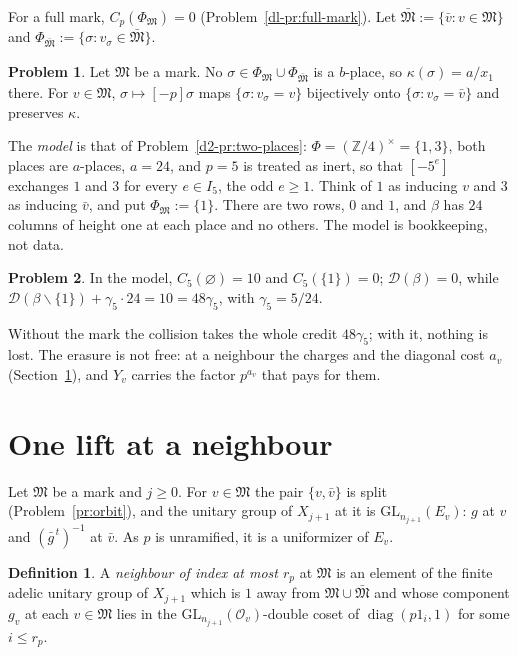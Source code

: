 \documentclass[reqno]{amsart}
\theoremstyle{plain}
\theoremstyle{definition}
\newtheorem{problem}{Problem}[section]
\newtheorem{definition}[theorem]{Definition}
\theoremstyle{remark}
\newcommand{\Z}{\mathbb{Z}}
\newcommand{\Oc}{\mathcal O}
\newcommand{\Dc}{\mathcal D}
\newcommand{\Mk}{\mathfrak M}
\newcommand{\Mb}{\bar{\mathfrak M}}
\begin{document}
For a full mark, \(C_p(\Phi_{\Mk}) = 0\) (Problem~\ref{dl-pr:full-mark}).  Let \(\Mb := \{\bar v : v \in \Mk\}\) and \(\Phi_{\Mb} := \{\sigma : v_\sigma \in \Mb\}\).

\begin{problem}\label{pr:no-b-place}
Let \(\Mk\) be a mark.  No \(\sigma \in \Phi_{\Mk} \cup \Phi_{\Mb}\) is a \(b\)-place, so \(\kappa(\sigma) = a/x_1\) there.  For \(v \in \Mk\), \(\sigma \mapsto [-p]\sigma\) maps \(\{\sigma : v_\sigma = v\}\) bijectively onto \(\{\sigma : v_\sigma = \bar v\}\) and preserves \(\kappa\).
\end{problem}

The \emph{model} is that of Problem~\ref{d2-pr:two-places}: \(\Phi = (\Z/4)^\times = \{1, 3\}\), both places are \(a\)-places, \(a = 24\), and \(p = 5\) is treated as inert, so that \([-5^e]\) exchanges \(1\) and \(3\) for every \(e \in I_5\), the odd \(e \ge 1\).  Think of \(1\) as inducing \(v\) and \(3\) as inducing \(\bar v\), and put \(\Phi_{\Mk} := \{1\}\).  There are two rows, \(0\) and \(1\), and \(\beta\) has \(24\) columns of height one at each place and no others.  The model is bookkeeping, not data.

\begin{problem}\label{pr:model-mark}
In the model, \(C_5(\varnothing) = 10\) and \(C_5(\{1\}) = 0\); \(\Dc(\beta) = 0\), while \(\Dc(\beta \smallsetminus \{1\}) + \gamma_5 \cdot 24 = 10 = 48\gamma_5\), with \(\gamma_5 = 5/24\).
\end{problem}

Without the mark the collision takes the whole credit \(48\gamma_5\); with it, nothing is lost.  The erasure is not free: at a neighbour the charges and the diagonal cost \(a_v\) (Section~\ref{sec:neighbour}), and \(Y_v\) carries the factor \(p^{a_v}\) that pays for them.

\section{One lift at a neighbour}\label{sec:neighbour}

Let \(\Mk\) be a mark and \(j \ge 0\).  For \(v \in \Mk\) the pair \(\{v, \bar v\}\) is split (Problem~\ref{pr:orbit}), and the unitary group of \(X_{j+1}\) at it is \(\mathrm{GL}_{n_{j+1}}(E_v)\): \(g\) at \(v\) and \((\bar g^{\,t})^{-1}\) at \(\bar v\).  As \(p\) is unramified, it is a uniformizer of \(E_v\).

\begin{definition}\label{def:neighbour}
A \emph{neighbour of index at most \(r_p\)} at \(\Mk\) is an element of the finite adelic unitary group of \(X_{j+1}\) which is \(1\) away from \(\Mk \cup \Mb\) and whose component \(g_v\) at each \(v \in \Mk\) lies in the \(\mathrm{GL}_{n_{j+1}}(\Oc_v)\)-double coset of \(\operatorname{diag}(p 1_i, 1)\) for some \(i \le r_p\).
\end{definition}
\end{document}
